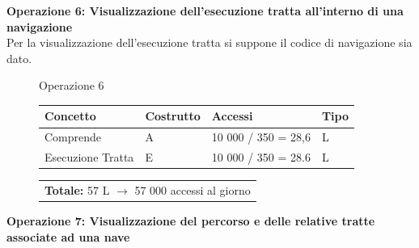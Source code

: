 \documentclass[a4paper, titlepage]{report}
\begin{document}
\vspace{1cm}
\noindent
\textbf{\large {Operazione 6: }}\textbf{Visualizzazione dell'esecuzione tratta all’interno di una navigazione}\\
Per la visualizzazione dell'esecuzione tratta si suppone il codice di navigazione sia dato.
	\begin{figure}[h!]
		\centering
		Operazione 6 \\
		\begin{tabular}{L{3cm}C{2.5cm}C{4.5cm}C{2.5cm}}
			\rule[-2mm]{0mm}{0.65cm}{}
			\textbf{Concetto} & \textbf{Costrutto} &\textbf{Accessi} & \textbf{Tipo} \\
			\hline\rule[-2mm]{0mm}{0.65cm}{}
			Comprende & A & 10 000 / 350 = 28,6  & L \\
			\hline\rule[-2mm]{0mm}{0.65cm}{}
			Esecuzione Tratta & E & 10 000 / 350 = 28.6  & L \\
		\end{tabular}
		\begin{tabular}{C{13.9cm}}
			\rule[-4mm]{0mm}{1cm}{}	
			 \textbf{Totale:} 57 L $\to$ 57 000 accessi al giorno
		\end{tabular}
	\end{figure}

\newpage
\noindent
\textbf{{\large {Operazione 7: }}}\textbf{Visualizzazione del percorso e delle relative tratte associate ad una nave}
\end{document}
